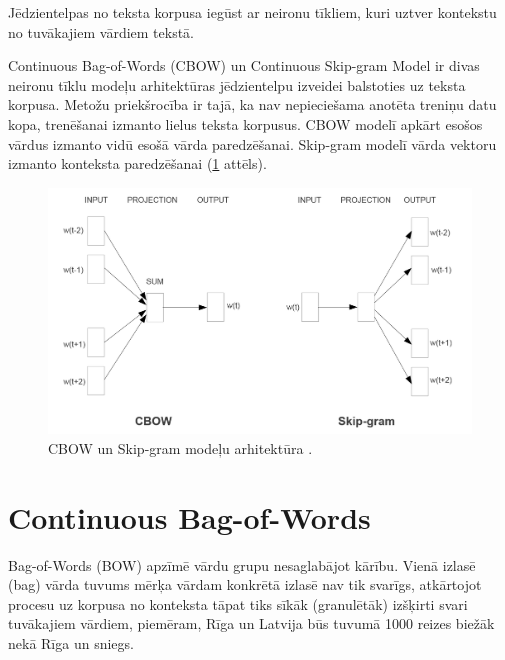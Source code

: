Jēdzientelpas no teksta korpusa iegūst ar neironu tīkliem, kuri uztver kontekstu no tuvākajiem vārdiem tekstā.

Continuous Bag-of-Words (CBOW) un Continuous Skip-gram Model ir divas neironu tīklu modeļu arhitektūras jēdzientelpu izveidei balstoties uz teksta korpusa. Metožu priekšrocība ir tajā, ka nav nepieciešama anotēta treniņu datu kopa, trenēšanai izmanto lielus teksta korpusus. CBOW modelī apkārt esošos vārdus izmanto vidū esošā vārda paredzēšanai. Skip-gram modelī vārda vektoru izmanto konteksta paredzēšanai (\ref{fig:cbow-skipgram} attēls).

\begin{figure}[h]
	\centering
	\includegraphics[width=\textwidth]{figures/word2vec-models.png}
	\caption{CBOW un Skip-gram modeļu arhitektūra \cite{word2vec2013}.}
	\label{fig:cbow-skipgram}
\end{figure}







\section{Continuous Bag-of-Words}

Bag-of-Words (BOW) apzīmē vārdu grupu nesaglabājot kārību. Vienā izlasē (bag) vārda tuvums mērķa vārdam konkrētā izlasē nav tik svarīgs, atkārtojot procesu uz korpusa no konteksta tāpat tiks sīkāk (granulētāk) izšķirti svari tuvākajiem vārdiem, piemēram, Rīga un Latvija būs tuvumā 1000 reizes biežāk nekā Rīga un sniegs.

